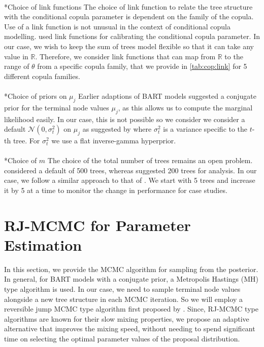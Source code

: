 \documentclass[
12pt]{article}
\makeatletter
\let\oldparagraph\paragraph
\renewcommand{\paragraph}{
	\@ifstar
	\xxxParagraphStar
	\xxxParagraphNoStar
}
\newcommand{\xxxParagraphStar}[1]{\oldparagraph*{#1}\mbox{}}
\newcommand{\xxxParagraphNoStar}[1]{\oldparagraph{#1}\mbox{}}
\makeatother
\begin{document}
	\paragraph*{Choice of link functions} The choice of link function to relate the tree structure with the conditional copula parameter is dependent on the family of the copula. Use of a link function is not unusual in the context of conditional copula modelling. \citet{ABEGAZ201243,valle_cond_cop} used link functions for calibrating the conditional copula parameter. In our case, we wish to keep the sum of trees model flexible so that it can take any value in $\mathbb{R}$. Therefore, we consider link functions that can map from $\mathbb{R}$ to the range of $\theta$ from a specific copula family, that we provide in \cref{tab:cop:link} for 5 different copula families.
	
	\paragraph*{Choice of priors on $\mu_j$}
	Earlier adaptions of BART models \citep{chipman2010BART,Sparapani_BART,Murray03042021} suggested a conjugate prior for the terminal node values $\mu_j$, as this allows us to compute the marginal likelihood easily. In our case, this is not possible so we consider we consider a default $\mathcal{N}(0,\sigma_{t}^2)$ on $\mu_j$ as suggested by \citet{chipman2010BART,Linero02012025} where $\sigma_{t}^2$ is a variance specific to the $t$-th tree. For $\sigma_{t}^2$ we use a flat inverse-gamma hyperprior.
	
	\paragraph*{Choice of $m$} The choice of the total number of trees remains an open problem. \citet{chipman2010BART} considered a default of 500 trees, whereas \citet{Linero02012025} suggested 200 trees for analysis. In our case, we follow a similar approach to that of \citet{serafini2024lossbasedpriortreetopologies}. We start with 5 trees and increase it by 5 at a time to monitor the change in performance for case studies. 
	
	\section{RJ-MCMC for Parameter Estimation}\label{sec:rjmcmc}
	
	In this section, we provide the MCMC algorithm for sampling from the posterior. In general, for BART models with a conjugate prior, a Metropolis Hastings (MH) type algorithm is used. In our case, we need to sample terminal node values alongside a new tree structure in each MCMC iteration. So we will employ a reversible jump MCMC type algorithm first proposed by \citet{green_RJMCMC}. Since, RJ-MCMC type algorithms are known for their slow mixing properties, we propose an adaptive alternative that improves the mixing speed, without needing to spend significant time on selecting the optimal parameter values of the proposal distribution.
	
\end{document}
